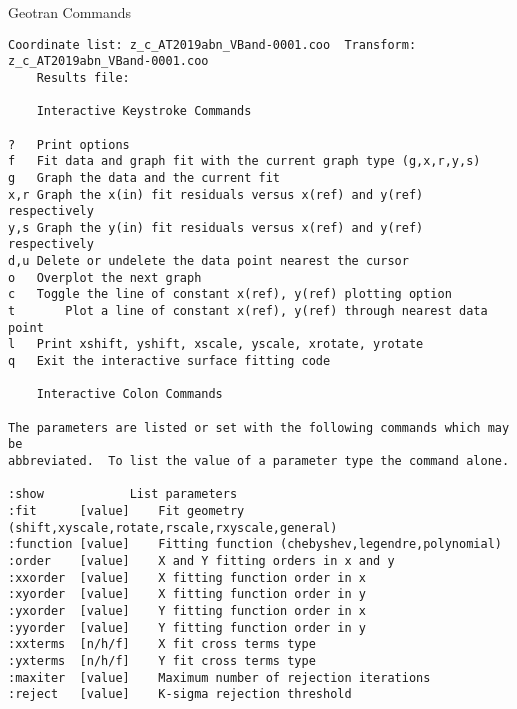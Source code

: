 Geotran Commands 

\begingroup \fontsize{10pt}{10pt}
\selectfont
\begin{verbatim} 
Coordinate list: z_c_AT2019abn_VBand-0001.coo  Transform: z_c_AT2019abn_VBand-0001.coo
    Results file: 

	Interactive Keystroke Commands

?	Print options
f	Fit data and graph fit with the current graph type (g,x,r,y,s)
g	Graph the data and the current fit
x,r	Graph the x(in) fit residuals versus x(ref) and y(ref) respectively
y,s	Graph the y(in) fit residuals versus x(ref) and y(ref) respectively
d,u	Delete or undelete the data point nearest the cursor
o	Overplot the next graph
c	Toggle the line of constant x(ref), y(ref) plotting option
t       Plot a line of constant x(ref), y(ref) through nearest data point	
l	Print xshift, yshift, xscale, yscale, xrotate, yrotate
q	Exit the interactive surface fitting code

	Interactive Colon Commands

The parameters are listed or set with the following commands which may be
abbreviated.  To list the value of a parameter type the command alone.

:show	 	     List parameters
:fit 	  [value]    Fit geometry (shift,xyscale,rotate,rscale,rxyscale,general)
:function [value]    Fitting function (chebyshev,legendre,polynomial)
:order	  [value]    X and Y fitting orders in x and y
:xxorder  [value]    X fitting function order in x
:xyorder  [value]    X fitting function order in y
:yxorder  [value]    Y fitting function order in x
:yyorder  [value]    Y fitting function order in y
:xxterms  [n/h/f]    X fit cross terms type
:yxterms  [n/h/f]    Y fit cross terms type
:maxiter  [value]    Maximum number of rejection iterations
:reject   [value]    K-sigma rejection threshold
\end{verbatim}
\endgroup
